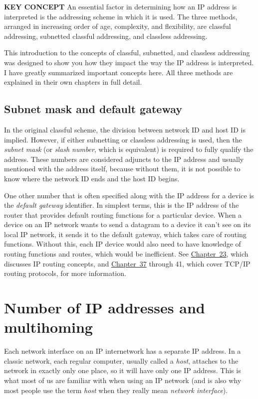 \documentclass[b5paper,11pt]{memoir}
\begin{document}
{\textbf{KEY CONCEPT}} An essential factor in determining how an IP
address is interpreted is the addressing scheme in which it is used. The
three methods, arranged in increasing order of age, complexity, and
flexibility, are classful addressing, subnetted classful addressing, and
classless addressing.

This introduction to the concepts of classful, subnetted, and classless
addressing was designed to show you how they impact the way the IP
address is interpreted. I have greatly summarized important concepts
here. All three methods are explained in their own chapters in full
detail.




\subsection{Subnet mask and default gateway}

In the original classful scheme, the division between network ID and host ID is
implied.
However, if either subnetting or classless addressing is used, then the {\emph{subnet mask}} (or {\emph{slash number}}, which is equivalent) is required to fully qualify the address.
These numbers are considered adjuncts to the IP address and usually mentioned with the address itself, because without them, it is not possible to know where the network ID ends and the host ID begins.

One other number that is often specified along with the IP address for a
device is the
\protect\hypertarget{ch16s04.htmlux5cux23idx-CHP-16-0666}{}{}{\emph{default
gateway}} identifier. In simplest terms, this is the IP address of the
router that provides default routing functions for a particular device.
When a device on an IP network wants to send a datagram to a device it
can't see on its local IP network, it sends it to the default gateway,
which takes care of routing functions. Without this, each IP device
would also need to have knowledge of routing functions and routes, which
would be inefficient. See \protect\hyperlink{ch23.html}{Chapter~23},
which discusses IP routing concepts, and
\protect\hyperlink{ch37.html}{Chapter~37} through 41, which cover TCP/IP
routing protocols, for more information.


\section{Number of IP addresses and multihoming}
Each network interface on an IP internetwork has a separate IP address.
In a classic network, each regular computer, usually called a
{\emph{host}}, attaches to the network in exactly only one place, so it
will have only one IP address. This is what most of us are familiar with
when using an IP network (and is also why most people use the term
{\emph{host}} when they really mean {\emph{network interface}}).
\end{document}
